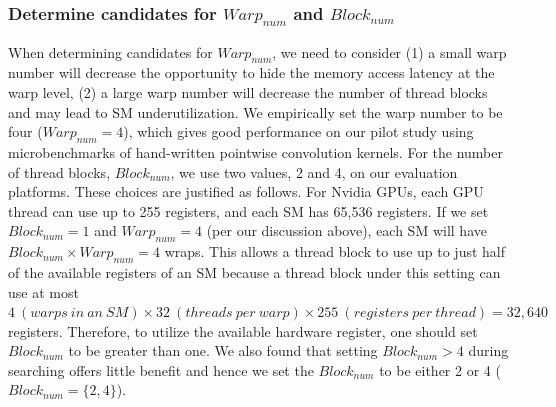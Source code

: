 \subsubsection{Determine candidates for $Warp_{num}$ and $Block_{num}$}
When determining candidates for $Warp_{num}$, we need to consider (1) a small warp number will decrease the opportunity to hide the memory access latency at the warp level, (2) a large warp number will decrease the number of thread blocks and may lead to SM underutilization.
We empirically set the warp number to be four ($Warp_{num}=4$), which gives good performance on our pilot study using microbenchmarks of hand-written pointwise convolution kernels.
For the number of thread blocks, $Block_{num}$, we use two values, 2 and 4, on our evaluation platforms.
These choices are justified as follows. For Nvidia GPUs, each GPU thread can use up to 255 registers, and each SM has 65,536 registers.
If we set $Block_{num}=1$ and $Warp_{num}=4$ (per our discussion above), each SM will have $Block_{num} \times Warp_{num}=4$ wraps.
This allows a thread block to use up to just half of the available registers of an SM because a thread block under this setting can use at most $4\ (warps\ in\ an\ SM) \times 32\ (threads\ per\ warp) \times 255\ (registers\ per\ thread)=32,640$ registers.
Therefore, to utilize the available hardware register, one should set $Block_{num}$ to be greater than one.
We also found that setting $Block_{num}>4$ during searching offers little benefit and hence we set the $Block_{num}$ to be either 2 or 4 ($Block_{num}=\{2,4\}$).


